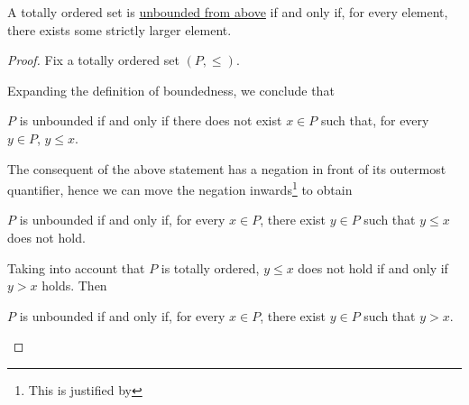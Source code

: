 \begin{lemma}\label{thm:unbounded_totally_ordered_set}
  A totally ordered set is \hyperref[def:extremal_points/upper_and_lower_bounds]{unbounded from above} if and only if, for every element, there exists some strictly larger element.
\end{lemma}
\begin{proof}
  Fix a totally ordered set \( (P, \leq) \).

  Expanding the definition of boundedness, we conclude that
  \begin{displayquote}
    \( P \) is unbounded if and only if there does not exist \( x \in P \) such that, for every \( y \in P \), \( y \leq x \).
  \end{displayquote}

  The consequent of the above statement has a negation in front of its outermost quantifier, hence we can move the negation inwards\footnote{This is justified by } to obtain
  \begin{displayquote}
    \( P \) is unbounded if and only if, for every \( x \in P \), there exist \( y \in P \) such that \( y \leq x \) does not hold.
  \end{displayquote}

  Taking into account that \( P \) is totally ordered, \( y \leq x \) does not hold if and only if \( y > x \) holds. Then
  \begin{displayquote}
    \( P \) is unbounded if and only if, for every \( x \in P \), there exist \( y \in P \) such that \( y > x \).
  \end{displayquote}
\end{proof}

